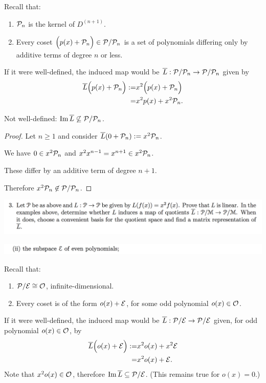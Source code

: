 \documentclass[12pt]{article}
\begin{document}
Recall that:
\begin{enumerate}
\item $\mathcal P_n$ is the kernel of $D^{(n+1)}$.
\item Every coset $\Big(p(x) + \mathcal P_n\Big) \in \mathcal P/\mathcal P_n$ is a set of polynomials differing
  only by additive terms of degree $n$ or less.
\end{enumerate}

If it were well-defined, the induced map would be $\overline L:\mathcal P/\mathcal P_n \to \mathcal P/\mathcal P_n$ given by
\begin{align*}
  \overline L\Big(p(x) + \mathcal P_n\Big) :=& x^2\Big(p(x) + \mathcal P_n\Big)\\
                                  =& x^2p(x) + x^2\mathcal P_n.
\end{align*}


\begin{claim*}
  Not well-defined: $\operatorname{\mathrm{Im}} \overline L \not\subseteq \mathcal P/\mathcal P_n$. %
\end{claim*}

\begin{proof}
  Let $n \geq 1$ and consider $\overline L(0 + \mathcal P_n) := x^2\mathcal P_n$.

  We have $0 \in x^2\mathcal P_n$ and $x^2x^{n-1} = x^{n+1} \in x^2\mathcal P_n$.

  These differ by an additive term of degree $n+1$.

  Therefore $x^2\mathcal P_n \not\in \mathcal P/\mathcal P_n$.
\end{proof}

\newpage
\begin{mdframed}
\includegraphics[width=400pt]{img/linear-algebra-a0-2-3.png}
\end{mdframed}
\begin{mdframed}
\includegraphics[width=400pt]{img/linear-algebra-a0-2-2-2.png}
\end{mdframed}
Recall that:
\begin{enumerate}
\item $\mathcal P/\mathcal E \cong \mathcal O$, infinite-dimensional.
\item Every coset is of the form $o(x) + \mathcal E$, for some odd polynomial $o(x) \in \mathcal O$.
\end{enumerate}
If it were well-defined, the induced map would be $\overline L:\mathcal P/\mathcal E \to \mathcal P/\mathcal E$ given, for
odd polynomial $o(x) \in \mathcal O$, by
\begin{align*}
  \overline L\Big(o(x) + \mathcal E\Big) :=& x^2o(x) + x^2\mathcal E\\
                                =& x^2o(x) + \mathcal E.
\end{align*}
Note that $x^2o(x) \in \mathcal O$, therefore $\operatorname{\mathrm{Im}} \overline L \subseteq \mathcal P/\mathcal E$. (This remains true for
$o(x) = 0$.)
\end{document}
